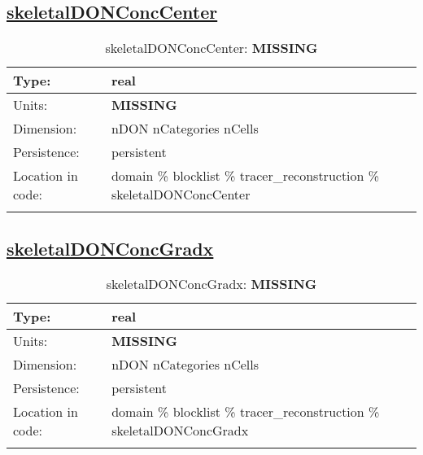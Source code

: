 \subsection[skeletalDONConcCenter]{\hyperref[sec:var_tab_tracer_reconstruction]{skeletalDONConcCenter}}
\label{subsec:var_sec_tracer_reconstruction_skeletalDONConcCenter}
\begin{center}
\begin{longtable}{| p{2.0in} | p{4.0in} |}
        \hline 
        Type: & real \\
        \hline 
        Units: & {\bf \color{red} MISSING} \\
        \hline 
        Dimension: & nDON nCategories nCells \\
        \hline 
        Persistence: & persistent \\
        \hline 
         Location in code: & domain \% blocklist \% tracer\_reconstruction \% skeletalDONConcCenter \\
         \hline 
    \caption{skeletalDONConcCenter: {\bf \color{red} MISSING}}
\end{longtable}
\end{center}
\subsection[skeletalDONConcGradx]{\hyperref[sec:var_tab_tracer_reconstruction]{skeletalDONConcGradx}}
\label{subsec:var_sec_tracer_reconstruction_skeletalDONConcGradx}
\begin{center}
\begin{longtable}{| p{2.0in} | p{4.0in} |}
        \hline 
        Type: & real \\
        \hline 
        Units: & {\bf \color{red} MISSING} \\
        \hline 
        Dimension: & nDON nCategories nCells \\
        \hline 
        Persistence: & persistent \\
        \hline 
         Location in code: & domain \% blocklist \% tracer\_reconstruction \% skeletalDONConcGradx \\
         \hline 
    \caption{skeletalDONConcGradx: {\bf \color{red} MISSING}}
\end{longtable}
\end{center}
